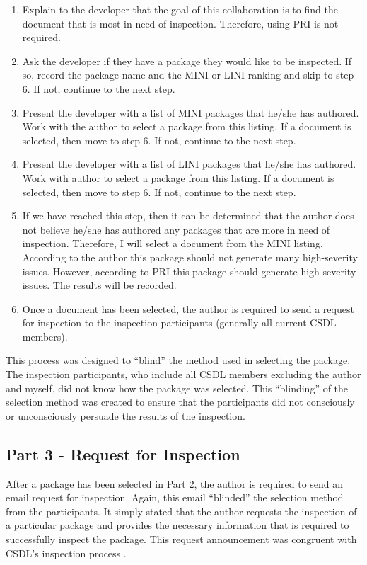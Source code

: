 \begin{enumerate} 
\item Explain to the developer that the goal of this collaboration is
  to find the document that is most in need of inspection. Therefore, using
  PRI is not required.
\item Ask the developer if they have a package they would like to be
  inspected. If so, record the package name and the MINI or LINI
  ranking and skip to step 6. If not, continue to the next step.
\item Present the developer with a list of MINI packages that he/she has
  authored. Work with the author to select a package from this listing. If
  a document is selected, then move to step 6. If not, continue to the next
  step.
\item Present the developer with a list of LINI packages that he/she has
  authored. Work with author to select a package from this listing. If a
  document is selected, then move to step 6. If not, continue to the next
  step.
\item If we have reached this step, then it can be determined that the
  author does not believe he/she has authored any packages that are more in
  need of inspection. Therefore, I will select a document from the MINI
  listing. According to the author this package should not generate many
  high-severity issues. However, according to PRI this package should generate
  high-severity issues. The results will be recorded.
\item Once a document has been selected, the author is required to send a
  request for inspection to the inspection participants (generally all
  current CSDL members).
\end{enumerate}

This process was designed to ``blind'' the method used in selecting the
package. The inspection participants, who include all CSDL members
excluding the author and myself, did not know how the package was selected.
This ``blinding'' of the selection method was created to ensure that the
participants did not consciously or unconsciously persuade the results of
the inspection.


\subsection{Part 3 - Request for Inspection}
After a package has been selected in Part 2, the author is required to send
an email request for inspection. Again, this email ``blinded'' the
selection method from the participants. It simply stated that the author
requests the inspection of a particular package and provides the necessary
information that is required to successfully inspect the package. This
request announcement was congruent with CSDL's inspection process
\cite{SoftwareReviewGuidelines}.


